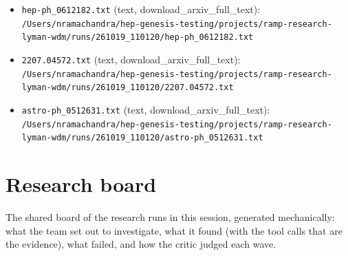 \documentclass[11pt,a4paper]{article}
\begin{document}
\begin{itemize}
  \item \texttt{hep-ph\_\allowbreak{}0612182.txt} (text, download\_arxiv\_full\_text): \texttt{/\allowbreak{}Users/\allowbreak{}nramachandra/\allowbreak{}hep-genesis-testing/\allowbreak{}projects/\allowbreak{}ramp-research-lyman-wdm/\allowbreak{}runs/\allowbreak{}261019\_\allowbreak{}110120/\allowbreak{}hep-ph\_\allowbreak{}0612182.txt}
  \item \texttt{2207.04572.txt} (text, download\_arxiv\_full\_text): \texttt{/\allowbreak{}Users/\allowbreak{}nramachandra/\allowbreak{}hep-genesis-testing/\allowbreak{}projects/\allowbreak{}ramp-research-lyman-wdm/\allowbreak{}runs/\allowbreak{}261019\_\allowbreak{}110120/\allowbreak{}2207.04572.txt}
  \item \texttt{astro-ph\_\allowbreak{}0512631.txt} (text, download\_arxiv\_full\_text): \texttt{/\allowbreak{}Users/\allowbreak{}nramachandra/\allowbreak{}hep-genesis-testing/\allowbreak{}projects/\allowbreak{}ramp-research-lyman-wdm/\allowbreak{}runs/\allowbreak{}261019\_\allowbreak{}110120/\allowbreak{}astro-ph\_\allowbreak{}0512631.txt}
\end{itemize}

\section{Research board}
\label{app:board}
The shared board of the research runs in this session, generated mechanically: what the team set out to investigate, what it found (with the tool calls that are the evidence), what failed, and how the critic judged each wave.
\end{document}
